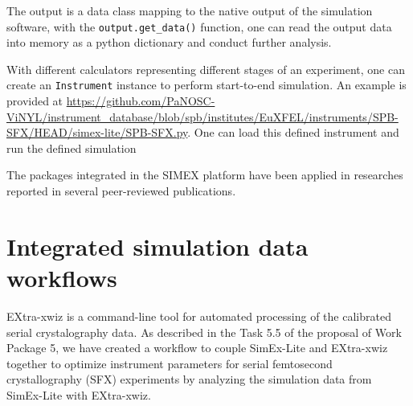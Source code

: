\documentclass[11pt, a4paper]{article}
\begin{document}
The output is a data class mapping to the native output of the simulation software, with the \verb|output.get_data()| function, one can read the output data into memory as a python dictionary and conduct further analysis.

With different calculators representing different stages of an experiment, one can create an \verb|Instrument| instance to perform start-to-end simulation. An example is provided at
\url{https://github.com/PaNOSC-ViNYL/instrument_database/blob/spb/institutes/EuXFEL/instruments/SPB-SFX/HEAD/simex-lite/SPB-SFX.py}. One can load this defined instrument and run the defined simulation 

The packages integrated in the SIMEX platform have been applied in researches reported in several peer-reviewed publications\cite{fortmann-grote2017iucrj,e2021,e2022}.




\section{Integrated simulation data workflows\label{sec:simdata}}
EXtra-xwiz is a command-line tool for automated processing of the calibrated serial crystalography data. \cite{xwiz} As described in the Task 5.5 of the proposal of Work Package 5, we have created a workflow to couple SimEx-Lite and EXtra-xwiz together to optimize instrument parameters for serial femtosecond crystallography (SFX) experiments by analyzing the simulation data from SimEx-Lite with EXtra-xwiz. 
\end{document}
